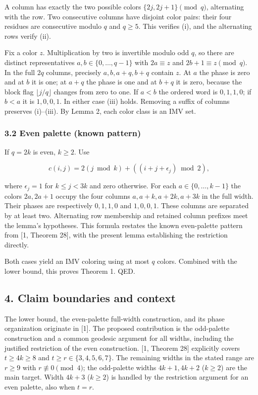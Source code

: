 \documentclass[
  11pt,
]{article}
\begin{document}
A column has exactly the two possible colors \(\{2j,2j+1\}\pmod q\),
alternating with the row. Two consecutive columns have disjoint color
pairs: their four residues are consecutive modulo \(q\) and \(q\ge5\).
This verifies (i), and the alternating rows verify (ii).

Fix a color \(z\). Multiplication by two is invertible modulo odd \(q\),
so there are distinct representatives \(a,b\in\{0,\dots,q-1\}\) with
\(2a\equiv z\) and \(2b+1\equiv z\pmod q\). In the full \(2q\) columns,
precisely \(a,b,a+q,b+q\) contain \(z\). At \(a\) the phase is zero and
at \(b\) it is one; at \(a+q\) the phase is one and at \(b+q\) it is
zero, because the block flag \(\lfloor j/q\rfloor\) changes from zero to
one. If \(a<b\) the ordered word is \(0,1,1,0\); if \(b<a\) it is
\(1,0,0,1\). In either case (iii) holds. Removing a suffix of columns
preserves (i)--(iii). By Lemma 2, each color class is an IMV set.

\subsubsection{3.2 Even palette (known
pattern)}\label{even-palette-known-pattern}

If \(q=2k\) is even, \(k\ge2\). Use

\[c(i,j)=2(j\bmod k)+((i+j+\epsilon_j)\bmod2),\]

where \(\epsilon_j=1\) for \(k\le j<3k\) and zero otherwise. For each
\(a\in\{0,\dots,k-1\}\) the colors \(2a,2a+1\) occupy the four columns
\(a,a+k,a+2k,a+3k\) in the full width. Their phases are respectively
\(0,1,1,0\) and \(1,0,0,1\). These columns are separated by at least
two. Alternating row membership and retained column prefixes meet the
lemma's hypotheses. This formula restates the known even-palette pattern
from {[}1, Theorem 28{]}, with the present lemma establishing the
restriction directly.

Both cases yield an IMV coloring using at most \(q\) colors. Combined
with the lower bound, this proves Theorem 1. QED.

\subsection{4. Claim boundaries and
context}\label{claim-boundaries-and-context}

The lower bound, the even-palette full-width construction, and its phase
organization originate in {[}1{]}. The proposed contribution is the
odd-palette construction and a common geodesic argument for all widths,
including the justified restriction of the even construction. {[}1,
Theorem 28{]} explicitly covers \(t\ge4k\ge8\) and
\(t\ge r\in\{3,4,5,6,7\}\). The remaining widths in the stated range are
\(r\ge9\) with \(r\not\equiv0\pmod4\); the odd-palette widths
\(4k+1,4k+2\) (\(k\ge2\)) are the main target. Width \(4k+3\)
(\(k\ge2\)) is handled by the restriction argument for an even palette,
also when \(t=r\).
\end{document}
